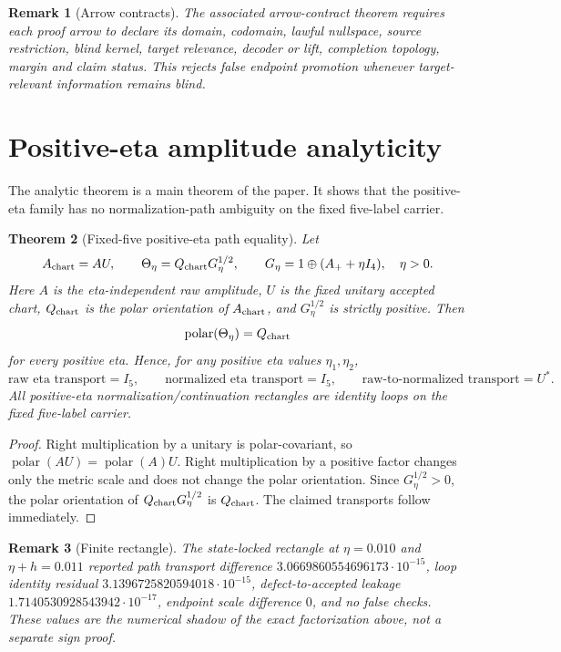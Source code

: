 \documentclass[11pt]{article}
\newtheorem{theorem}{Theorem}[section]
\newtheorem{remark}[theorem]{Remark}
\begin{document}
\begin{remark}[Arrow contracts]
The associated arrow-contract theorem requires each proof arrow to declare its domain, codomain, lawful nullspace, source restriction, blind kernel, target relevance, decoder or lift, completion topology, margin and claim status.  This rejects false endpoint promotion whenever target-relevant information remains blind.
\end{remark}

\section{Positive-eta amplitude analyticity}

The analytic theorem is a main theorem of the paper.  It shows that the positive-eta family has no normalization-path ambiguity on the fixed five-label carrier.

\begin{theorem}[Fixed-five positive-eta path equality]
Let
\[
A_{\rm chart}=AU,
\qquad
\Theta_\eta=Q_{\rm chart}G_\eta^{1/2},
\qquad
G_\eta=1\oplus(A_+ + \eta I_4),\quad \eta>0.
\]
Here \(A\) is the eta-independent raw amplitude, \(U\) is the fixed unitary accepted chart, \(Q_{\rm chart}\) is the polar orientation of \(A_{\rm chart}\), and \(G_\eta^{1/2}\) is strictly positive.  Then
\[
\operatorname{polar}(\Theta_\eta)=Q_{\rm chart}
\]
for every positive eta.  Hence, for any positive eta values \(\eta_1,\eta_2\),
\[
\text{raw eta transport}=I_5,\qquad
\text{normalized eta transport}=I_5,\qquad
\text{raw-to-normalized transport}=U^*.
\]
All positive-eta normalization/continuation rectangles are identity loops on the fixed five-label carrier.
\end{theorem}

\begin{proof}
Right multiplication by a unitary is polar-covariant, so \(\operatorname{polar}(AU)=\operatorname{polar}(A)U\).  Right multiplication by a positive factor changes only the metric scale and does not change the polar orientation.  Since \(G_\eta^{1/2}>0\), the polar orientation of \(Q_{\rm chart}G_\eta^{1/2}\) is \(Q_{\rm chart}\).  The claimed transports follow immediately.
\end{proof}

\begin{remark}[Finite rectangle]
The state-locked rectangle at \(\eta=0.010\) and \(\eta+h=0.011\) reported path transport difference \(3.0669860554696173\cdot10^{-15}\), loop identity residual \(3.1396725820594018\cdot10^{-15}\), defect-to-accepted leakage \(1.7140530928543942\cdot10^{-17}\), endpoint scale difference \(0\), and no false checks.  These values are the numerical shadow of the exact factorization above, not a separate sign proof.
\end{remark}
\end{document}
